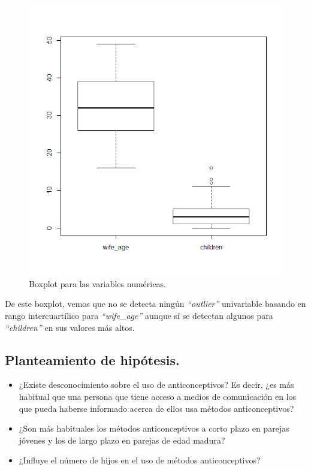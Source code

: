 \documentclass[a4paper,12pt, oneside]{book}
\begin{document}
\begin{figure}[H]
\centering
\includegraphics[scale=0.7]{images/boxplot_contraceptive.png}
\caption{Boxplot para las variables numéricas.}
\end{figure}
De este boxplot, vemos que no se detecta ningún \textit{``outlier''} univariable basando en rango intercuartílico para \textit{``wife\_age''} aunque sí se detectan algunos para \textit{``children''} en sus valores más altos. 

\newpage
\subsection{Planteamiento de hipótesis.}
\begin{itemize}
	\item ¿Existe desconocimiento sobre el uso de anticonceptivos? Es decir, ¿es más habitual que una persona que tiene acceso a medios de comunicación en los que pueda haberse informado acerca de ellos usa métodos anticonceptivos?
	\item ¿Son más habituales los métodos anticonceptivos a corto plazo en parejas jóvenes y los de largo plazo en parejas de edad madura?
	\item ¿Influye el número de hijos en el uso de métodos anticonceptivos?
\end{itemize}
\end{document}
